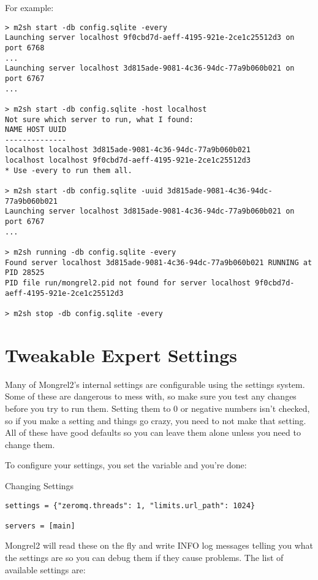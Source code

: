 For example:
\begin{Verbatim}
> m2sh start -db config.sqlite -every
Launching server localhost 9f0cbd7d-aeff-4195-921e-2ce1c25512d3 on port 6768
...
Launching server localhost 3d815ade-9081-4c36-94dc-77a9b060b021 on port 6767
...

> m2sh start -db config.sqlite -host localhost
Not sure which server to run, what I found:
NAME HOST UUID
--------------
localhost localhost 3d815ade-9081-4c36-94dc-77a9b060b021
localhost localhost 9f0cbd7d-aeff-4195-921e-2ce1c25512d3
* Use -every to run them all.

> m2sh start -db config.sqlite -uuid 3d815ade-9081-4c36-94dc-77a9b060b021
Launching server localhost 3d815ade-9081-4c36-94dc-77a9b060b021 on port 6767
...

> m2sh running -db config.sqlite -every
Found server localhost 3d815ade-9081-4c36-94dc-77a9b060b021 RUNNING at PID 28525
PID file run/mongrel2.pid not found for server localhost 9f0cbd7d-aeff-4195-921e-2ce1c25512d3

> m2sh stop -db config.sqlite -every
\end{Verbatim}

\section{Tweakable Expert Settings}

Many of Mongrel2's internal settings are configurable using the settings system.
Some of these are dangerous to mess with, so make sure you test any changes before
you try to run them.  Setting them to 0 or negative numbers isn't checked, so if
you make a setting and things go crazy, you need to not make that setting.  All
of these have good defaults so you can leave them alone unless you need to change
them.

To configure your settings, you set the variable  and you're done:

\begin{code}{Changing Settings}
\begin{lstlisting}
settings = {"zeromq.threads": 1, "limits.url_path": 1024}

servers = [main]
\end{lstlisting}
\end{code}

Mongrel2 will read these on the fly and write INFO log messages telling you
what the settings are so you can debug them if they cause problems.  The list
of available settings are:

